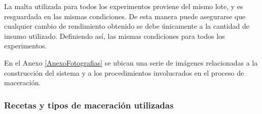         \par La malta utilizada para todos los experimentos proviene del mismo lote, y es resguardada en las mismas condiciones. De esta manera puede asegurarse que cualquier cambio de rendimiento obtenido se debe únicamente a la cantidad de insumo utilizado. Definiendo así, las mismas condiciones para todos los experimentos.
        
        En el Anexo \ref{AnexoFotografias} se ubican una serie de imágenes relacionadas a la construcción del sistema y a los procedimientos involucrados en el proceso de maceración.
        
        \subsubsection{Recetas y tipos de maceración utilizadas}
        
